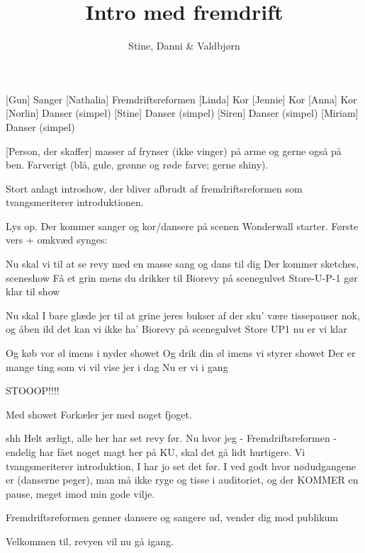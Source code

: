 \documentclass[a4paper,11pt]{article}
\title{Intro med fremdrift}
\author{Stine, Danni \& Valdbjørn}
\begin{document}
\maketitle

\begin{roles}
    [Gun] Sanger
    [Nathalia] Fremdriftsreformen
    [Linda] Kor
    [Jennie] Kor
    [Anna] Kor
    [Norlin] Danser (simpel)
    [Stine] Danser (simpel)
    [Siren] Danser (simpel)
    [Miriam] Danser (simpel)
\end{roles}

\begin{props}
    [Person, der skaffer] masser af frynser (ikke vinger) på arme og gerne også på ben. Farverigt (blå, gule, grønne og røde farve; gerne shiny).

\end{props}
\scene Stort anlagt introshow, der bliver afbrudt af fremdriftsreformen som tvangsmeriterer introduktionen. 

  \scene Lys op.
  \scene Der kommer sanger og kor/dansere på scenen
Wonderwall starter. 
Første vers + omkvæd synges: 
\begin{song}


   Nu skal vi til at se revy
med en masse sang og dans til dig
Der kommer sketches, sceneshow
Få et grin mens du drikker til
Biorevy på scenegulvet
Store-U-P-1 gør klar til show

Nu skal I bare glæde jer
til at grine jeres bukser af
der sku’ være tissepauser nok, 
og åben ild det kan vi ikke ha’
Biorevy på scenegulvet
Store UP1 nu er vi klar

Og køb vor øl imens i nyder showet
Og drik din øl imens vi styrer showet
Der er mange ting som vi vil vise jer i dag
Nu er vi i gang
\end{song}

\begin{sketch}
   STOOOP!!!! 

    Med showet 
    Forkæler jer med noget fjoget.

   shh
   Helt ærligt, alle her har set revy før. Nu hvor jeg - Fremdriftsreformen - endelig har fået noget magt her på KU, skal det gå lidt hurtigere. Vi tvangsmeriterer introduktion, I har jo set det før. I ved godt hvor nødudgangene er (danserne peger), man må ikke ryge og tisse i auditoriet, og der KOMMER en pause, meget imod min gode vilje. 

  \scene Fremdriftsreformen genner dansere og sangere ud, vender dig mod publikum

   Velkommen til, revyen vil nu gå igang.
  

\end{sketch}
\end{document}
